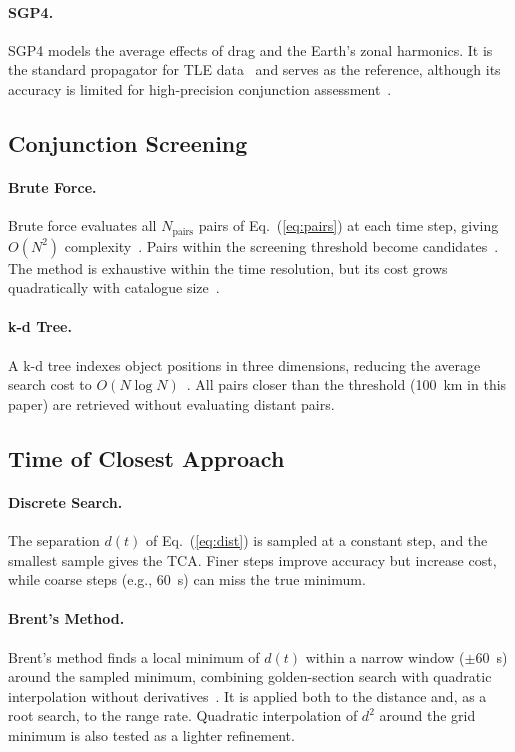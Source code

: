 \documentclass[runningheads]{llncs}
\begin{document}
\paragraph{SGP4.}
SGP4 models the average effects of drag and the Earth's zonal harmonics. It is the standard propagator for TLE data~\cite{b26} and serves as the reference, although its accuracy is limited for high-precision conjunction assessment~\cite{b18}.

\subsection{Conjunction Screening}
\paragraph{Brute Force.}
Brute force evaluates all $N_{\mathrm{pairs}}$ pairs of Eq.~(\ref{eq:pairs}) at each time step, giving $O(N^2)$ complexity~\cite{b9,b14,b17}. Pairs within the screening threshold become candidates~\cite{b14}. The method is exhaustive within the time resolution, but its cost grows quadratically with catalogue size~\cite{b17,b18}.

\paragraph{k-d Tree.}
A k-d tree indexes object positions in three dimensions, reducing the average search cost to $O(N \log N)$~\cite{b27,b28}. All pairs closer than the threshold (100~km in this paper) are retrieved without evaluating distant pairs.

\subsection{Time of Closest Approach}
\paragraph{Discrete Search.}
The separation $d(t)$ of Eq.~(\ref{eq:dist}) is sampled at a constant step, and the smallest sample gives the TCA. Finer steps improve accuracy but increase cost, while coarse steps (e.g., 60~s) can miss the true minimum.

\paragraph{Brent's Method.}
Brent's method finds a local minimum of $d(t)$ within a narrow window ($\pm 60$~s) around the sampled minimum, combining golden-section search with quadratic interpolation without derivatives~\cite{b22}. It is applied both to the distance and, as a root search, to the range rate. Quadratic interpolation of $d^2$ around the grid minimum is also tested as a lighter refinement.
\end{document}
